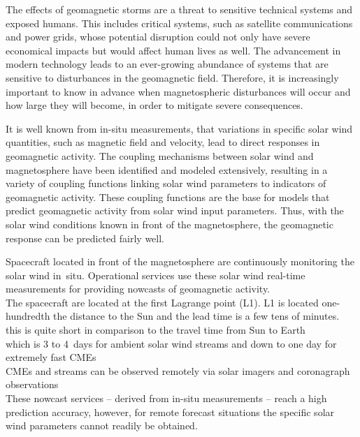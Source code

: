 The effects of geomagnetic storms are a threat to sensitive technical systems and exposed humans. This includes critical systems, such as satellite communications and power grids, whose potential disruption could not only have severe economical impacts but would affect human lives as well. The advancement in modern technology leads to an ever-growing abundance of systems that are sensitive to disturbances in the geomagnetic field. Therefore, it is increasingly important to know in advance when magnetospheric disturbances will occur and how large they will become, in order to mitigate severe consequences.

It is well known from in-situ measurements, that variations in specific solar wind quantities, such as magnetic field and velocity, lead to direct responses in geomagnetic activity. The coupling mechanisms between solar wind and magnetosphere have been identified and modeled extensively, resulting in a variety of coupling functions linking solar wind parameters to indicators of geomagnetic activity. These coupling functions are the base for models that predict geomagnetic activity from solar wind input parameters. Thus, with the solar wind conditions known in front of the magnetosphere, the geomagnetic response can be predicted fairly well.

Spacecraft located in front of the magnetosphere are continuously monitoring the solar wind in~situ. Operational services use these solar wind real-time measurements for providing nowcasts of geomagnetic activity.\\


The spacecraft are located at the first Lagrange point (L1). L1 is located one-hundredth the distance to the Sun and the lead time is a few tens of minutes.\\

this is quite short in comparison to the travel time from Sun to Earth\\

which is 3 to 4~days for ambient solar wind streams and down to one day for extremely fast CMEs\\
CMEs and streams can be observed remotely via solar imagers and coronagraph observations\\


These nowcast services -- derived from in-situ measurements -- reach a high prediction accuracy, however, for remote forecast situations the specific solar wind parameters cannot readily be obtained.\\


